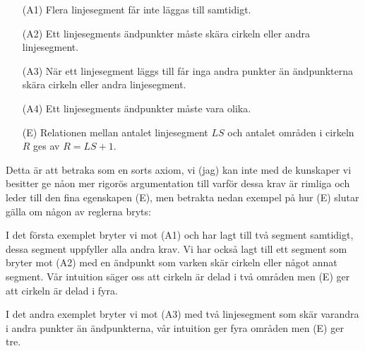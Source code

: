 \documentclass{article}
\begin{document}
\begin{itemize}
  \item[(A1)] Flera linjesegment får inte läggas till samtidigt.
  \item[(A2)] Ett linjesegments ändpunkter måste skära cirkeln eller andra linjesegment.
  \item[(A3)] När ett linjesegment läggs till får inga andra punkter än ändpunkterna skära cirkeln eller andra linjesegment.
  \item[(A4)] Ett linjesegments ändpunkter måste vara olika.
  \item[(E)] Relationen mellan antalet linjesegment $LS$ och antalet områden i cirkeln $R$ ges av $R = LS + 1$.
\end{itemize}

Detta är att betraka som en sorts axiom, vi (jag) kan inte med de kunskaper vi besitter ge nåon mer rigorös argumentation till varför dessa krav är rimliga och leder till den fina egenskapen (E), men betrakta nedan exempel på hur (E) slutar gälla om någon av reglerna bryts:

\begin{center}
\end{center}


I det första exemplet bryter vi mot (A1) och har lagt till två segment samtidigt, dessa segment uppfyller alla andra krav. Vi har också lagt till ett segment som bryter mot (A2) med en ändpunkt som varken skär cirkeln eller något annat segment. Vår intuition säger oss att cirkeln är delad i två områden men (E) ger att cirkeln är delad i fyra.

I det andra exemplet bryter vi mot (A3) med två linjesegment som skär varandra i andra punkter än ändpunkterna, vår intuition ger fyra områden men (E) ger tre.
\end{document}

